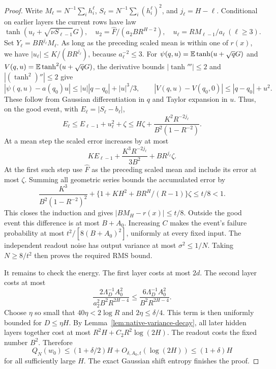 \begin{proof}
Write $M_\ell=N^{-1}\sum_i h_i^\ell$, $S_\ell=N^{-1}\sum_i(h_i^\ell)^2$, and $j_\ell=H-\ell$. Conditional on earlier layers the current rows have law
\[
 \tanh(u_\ell+\sqrt{\nu S_{\ell-1}}G),\quad
 u_2=\widehat F/(a_2BR^{H-2}),\quad
 u_\ell=RM_{\ell-1}/a_\ell\ (\ell\ge3).
\]
Set $Y_\ell=BR^{j_\ell}M_\ell$. As long as the preceding scaled mean is within one of $r(x)$, we have
$|u_\ell|\le K/(BR^{j_\ell})$, because $a_\ell^{-2}\le3$.
For
$\psi(q,u)=\mathbb E\tanh(u+\sqrt qG)$ and
$V(q,u)=\mathbb E\tanh^2(u+\sqrt qG)$, the derivative bounds $|\tanh'''|\le2$ and $|(\tanh^2)''|\le2$ give
\[
 |\psi(q,u)-a(q_0)u|\le |u||q-q_0|+|u|^3/3,
 \qquad |V(q,u)-V(q_0,0)|\le|q-q_0|+u^2.
\]
These follow from Gaussian differentiation in $q$ and Taylor expansion in $u$.
Thus, on the good event, with $E_\ell=|S_\ell-b_\ell|$,
\[
 E_\ell\le E_{\ell-1}+u_\ell^2+\zeta
 \le H\zeta+\frac{K^2R^{-2j_\ell}}{B^2(1-R^{-2})}.
\]
At a mean step the scaled error increases by at most
\[
 K E_{\ell-1}+\frac{K^3R^{-2j_\ell}}{3B^2}
                        +BR^{j_\ell}\zeta.
\]
At the first such step use $\widehat F$ as the preceding scaled mean and include its error at most $\zeta$. Summing all geometric series bounds the accumulated error by
\[
 \frac{K^3}{B^2(1-R^{-2})^2}
       +\{1+KH^2+BR^H/(R-1)\}\zeta
 \le t/8<1.
\]
This closes the induction and gives $|BM_H-r(x)|\le t/8$.
Outside the good event this difference is at most $B+A_0$. Increasing $C$ makes the event's failure probability at most $t^2/[8(B+A_0)^2]$, uniformly at every fixed input. The independent readout noise has output variance at most $\sigma^2\le1/N$. Taking $N\ge8/t^2$ then proves the required RMS bound.

It remains to check the energy. The first layer costs at most $2d$. The second layer costs at most
\[
 \frac{2\Lambda_D^{-1}A_0^2}{a_2^2 B^2R^{2H-4}}
 \le\frac{6\Lambda_D^{-1}A_0^2}{B^2R^{2H-4}}.
\]
Choose $\eta$ so small that $40\eta<2\log R$ and $2\eta\le\delta/4$. This term is then uniformly bounded for $D\le\eta H$. By Lemma~\ref{lem:native-variance-decay}, all later hidden layers together cost at most $R^2H+C_2R^2\log(2H)$. The readout costs the fixed number $B^2$. Therefore
\[
 Q_N(w_0)\le(1+\delta/2)H+O_{\delta,A_0,t}(\log(2H))
                 \le(1+\delta)H
\]
for all sufficiently large $H$. The exact Gaussian shift entropy finishes the proof.
\end{proof}

